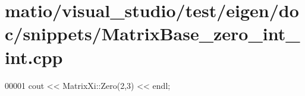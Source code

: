 \hypertarget{matio_2visual__studio_2test_2eigen_2doc_2snippets_2_matrix_base__zero__int__int_8cpp_source}{}\section{matio/visual\+\_\+studio/test/eigen/doc/snippets/\+Matrix\+Base\+\_\+zero\+\_\+int\+\_\+int.cpp}
\label{matio_2visual__studio_2test_2eigen_2doc_2snippets_2_matrix_base__zero__int__int_8cpp_source}

\begin{DoxyCode}
00001 cout << MatrixXi::Zero(2,3) << endl;
\end{DoxyCode}
